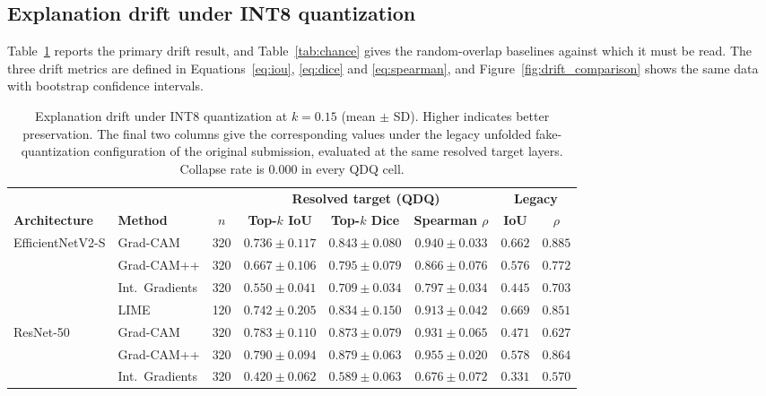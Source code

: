 \documentclass[fleqn,10pt]{wlscirep}
\begin{document}
\subsection*{Explanation drift under INT8 quantization}

Table~\ref{tab:drift_main} reports the primary drift result, and Table~\ref{tab:chance} gives the random-overlap baselines against which it must be read. The three drift metrics are defined in Equations~\eqref{eq:iou}, \eqref{eq:dice} and \eqref{eq:spearman}, and Figure~\ref{fig:drift_comparison} shows the same data with bootstrap confidence intervals.

\begin{table}[!ht]
\centering
\scriptsize
\caption{Explanation drift under INT8 quantization at $k = 0.15$ (mean $\pm$ SD). Higher indicates better preservation. The final two columns give the corresponding values under the legacy unfolded fake-quantization configuration of the original submission, evaluated at the same resolved target layers. Collapse rate is $0.000$ in every QDQ cell.}
\label{tab:drift_main}
\setlength{\tabcolsep}{4pt}
\begin{tabular}{ll c ccc cc}
\toprule
 & & & \multicolumn{3}{c}{\textbf{Resolved target (QDQ)}} & \multicolumn{2}{c}{\textbf{Legacy}} \\
\cmidrule(lr){4-6} \cmidrule(lr){7-8}
\textbf{Architecture} & \textbf{Method} & \textbf{$n$} & \textbf{Top-$k$ IoU} & \textbf{Top-$k$ Dice} & \textbf{Spearman $\rho$} & \textbf{IoU} & \textbf{$\rho$} \\
\midrule
\multirow{4}{*}{EfficientNetV2-S}
 & Grad-CAM & 320 & $0.736 \pm 0.117$ & $0.843 \pm 0.080$ & $0.940 \pm 0.033$ & $0.662$ & $0.885$ \\
 & Grad-CAM++ & 320 & $0.667 \pm 0.106$ & $0.795 \pm 0.079$ & $0.866 \pm 0.076$ & $0.576$ & $0.772$ \\
 & Int.\ Gradients & 320 & $0.550 \pm 0.041$ & $0.709 \pm 0.034$ & $0.797 \pm 0.034$ & $0.445$ & $0.703$ \\
 & LIME & 120 & $0.742 \pm 0.205$ & $0.834 \pm 0.150$ & $0.913 \pm 0.042$ & $0.669$ & $0.851$ \\
\midrule
\multirow{4}{*}{ResNet-50}
 & Grad-CAM & 320 & $0.783 \pm 0.110$ & $0.873 \pm 0.079$ & $0.931 \pm 0.065$ & $0.471$ & $0.627$ \\
 & Grad-CAM++ & 320 & $0.790 \pm 0.094$ & $0.879 \pm 0.063$ & $0.955 \pm 0.020$ & $0.578$ & $0.864$ \\
 & Int.\ Gradients & 320 & $0.420 \pm 0.062$ & $0.589 \pm 0.063$ & $0.676 \pm 0.072$ & $0.331$ & $0.570$ \\

\end{tabular}
\end{table}
\end{document}
